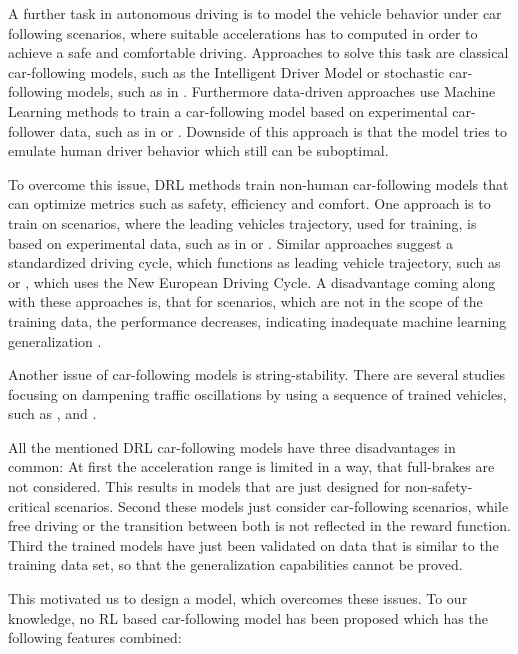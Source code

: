 \documentclass[review]{elsarticle}
\begin{document}
A further task in autonomous driving is to model the vehicle behavior under car following scenarios, where suitable accelerations has to computed in order to achieve a safe and comfortable driving. Approaches to solve this task are classical car-following models, such as the Intelligent Driver Model \cite{Opus} or stochastic car-following models, such as in \cite{Treiber2018stochIDM_TRB}. Furthermore data-driven approaches use Machine Learning methods to train a car-following model based on experimental car-follower data, such as in \cite{Chong2011SimulationOD} or \cite{ZHOU2017245}. Downside of this approach is that the model tries to emulate human driver behavior which still can be suboptimal.

To overcome this issue, DRL methods train non-human car-following models that can optimize metrics such as safety, efficiency and comfort. 
One approach is to train on scenarios, where the leading vehicles trajectory, used for training, is based on experimental data, such as in \cite{SafeEfficientAndComfortable} or \cite{HumanLikeAutonomouCF}. Similar approaches suggest a standardized driving cycle, which functions as leading vehicle trajectory, such as \cite{ComparisonRLvsMPC} or \cite{CFelectricVehicle}, which uses the New European Driving Cycle.
A disadvantage coming along with these approaches is, that for scenarios, which are not in the scope of the training data, the performance decreases, indicating inadequate machine learning generalization \cite{ComparisonRLvsMPC}. 

Another issue of car-following models is string-stability. There are several studies focusing on dampening traffic oscillations by using a sequence of trained vehicles, such as \cite{qu2020jointly}, \cite{DissipatingStopAndGoWaves} and \cite{DampenStopAndGoTraffic}.

All the mentioned DRL car-following models have three disadvantages in common: At first the acceleration range is limited in a way, that full-brakes are not considered. This results in models that are just designed for non-safety-critical scenarios. Second these models just consider car-following scenarios, while free driving or the transition between both is not reflected in the reward function. Third the trained models have just been validated on data that is similar to the training data set, so that the generalization capabilities cannot be proved. 

This motivated us to design a model, which overcomes these issues.
To our knowledge, no RL based car-following model has been proposed which has the following features combined:
\end{document}
